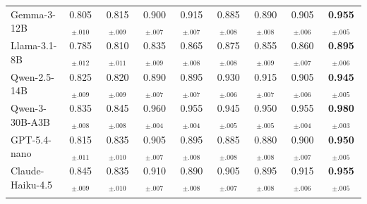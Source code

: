 \begin{table}[t]
\begin{tabular}{lcccccccc}
 Gemma-3-12B      & 0.805$_{\pm .010}$ & 0.815$_{\pm .009}$ & 0.900$_{\pm .007}$ & 0.915$_{\pm .007}$ & 0.885$_{\pm .008}$ & 0.890$_{\pm .008}$ & 0.905$_{\pm .006}$ & \textbf{\cellcolor{blue!6}0.955$_{\pm .005}$} \\
 Llama-3.1-8B     & 0.785$_{\pm .012}$ & 0.810$_{\pm .011}$ & 0.835$_{\pm .009}$ & 0.865$_{\pm .008}$ & 0.875$_{\pm .008}$ & 0.855$_{\pm .009}$ & 0.860$_{\pm .007}$ & \textbf{\cellcolor{blue!6}0.895$_{\pm .006}$} \\
 Qwen-2.5-14B     & 0.825$_{\pm .009}$ & 0.820$_{\pm .009}$ & 0.890$_{\pm .007}$ & 0.895$_{\pm .007}$ & 0.930$_{\pm .006}$ & 0.915$_{\pm .007}$ & 0.905$_{\pm .006}$ & \textbf{\cellcolor{blue!6}0.945$_{\pm .005}$} \\
 Qwen-3-30B-A3B   & 0.835$_{\pm .008}$ & 0.845$_{\pm .008}$ & 0.960$_{\pm .004}$ & 0.955$_{\pm .004}$ & 0.945$_{\pm .005}$ & 0.950$_{\pm .005}$ & 0.955$_{\pm .004}$ & \textbf{\cellcolor{blue!6}0.980$_{\pm .003}$} \\
 GPT-5.4-nano     & 0.815$_{\pm .011}$ & 0.835$_{\pm .010}$ & 0.905$_{\pm .007}$ & 0.895$_{\pm .008}$ & 0.885$_{\pm .008}$ & 0.880$_{\pm .008}$ & 0.900$_{\pm .007}$ & \textbf{\cellcolor{blue!6}0.950$_{\pm .005}$} \\
 Claude-Haiku-4.5 & 0.845$_{\pm .009}$ & 0.835$_{\pm .010}$ & 0.910$_{\pm .007}$ & 0.890$_{\pm .008}$ & 0.905$_{\pm .007}$ & 0.895$_{\pm .008}$ & 0.915$_{\pm .006}$ & \textbf{\cellcolor{blue!6}0.955$_{\pm .005}$} \\
\midrule

\rowcolor{gray!10}
\multicolumn{9}{c}{\textbf{MATH-500}} \\
\midrule


\end{tabular}
\end{table}
